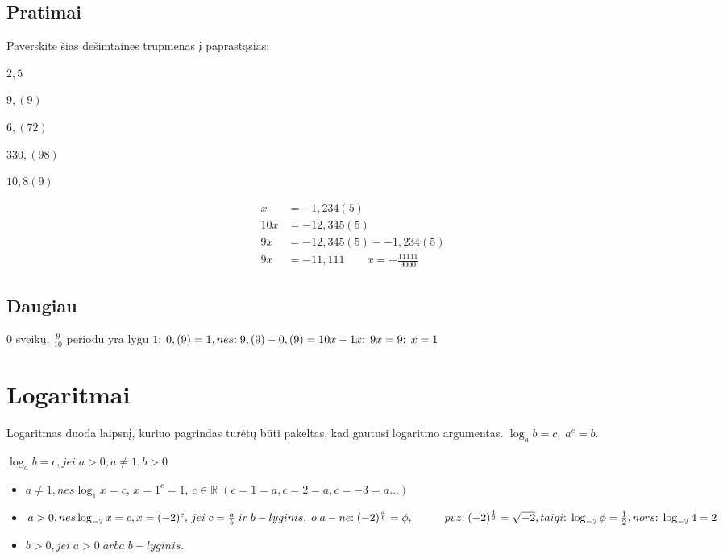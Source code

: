 \documentclass[fleqn]{article} %
\newenvironment{exercises}{\begin{enumerate*}[label=\alph*), itemjoin=\qquad]}{\end{enumerate*}}
\begin{document}
\subsection{Pratimai}

Paverskite šias dešimtaines trupmenas į paprastąsias: \\
\begin{exercises}
    \item $2,5      $
    \item $9,(9)    $
    \item $6,(72)   $
    \item $330,(98) $
    \item $10,8(9)  $ 
\end{exercises} 

\begin{align*}
    x   &= -1,234(5)              \\
    10x &= -12,345(5)             \\
    9x  &= -12,345(5) - -1,234(5) \\
    9x  &= -11,111  \qquad  x = -\frac{11111}{9000}
\end{align*}  

\subsection{Daugiau}
$0$ sveikų, $\frac{9}{10}$ periodu yra lygu $1$:
\begin{math}\\
    0,(9) = 1, nes{:}\; 9,(9) - 0,(9) = 10x - 1x;\; 9x = 9;\; x = 1
\end{math}


\section{Logaritmai}

Logaritmas duoda laipsnį, kuriuo pagrindas turėtų būti pakeltas, kad gautusi logaritmo argumentas.
$\log_a b = c,\;a^c = b$.

\begin{math}
    \log_a b = c, jei\; a > 0, a \ne 1, b > 0
\end{math}

\begin{itemize}
    \item $a \ne 1, nes \log_1 x = c,\,x = 1^c = 1,\, c \in \mathbb{R}\; 
    (c = 1 = a, c = 2 = a, c = -3 = a \dots)$
    \item $a > 0, nes \log_{-2} x = c, x = (-2)^c,\,jei\;c = \frac{a}{b}\;ir\;b - lyginis,\;o\;a - ne{:}\; (-2)^\frac{a}{b} = \phi,\\ \hspace*{10mm} pvz{:}\; (-2)^\frac{1}{2} = \sqrt{-2}, taigi{:}\;\log_{-2} \phi = \frac{1}{2}, nors{:}\; \log_{-2} 4 = 2$
    \item $b > 0, jei\;a > 0\;arba\;b - lyginis.$
\end{itemize}
\end{document}
